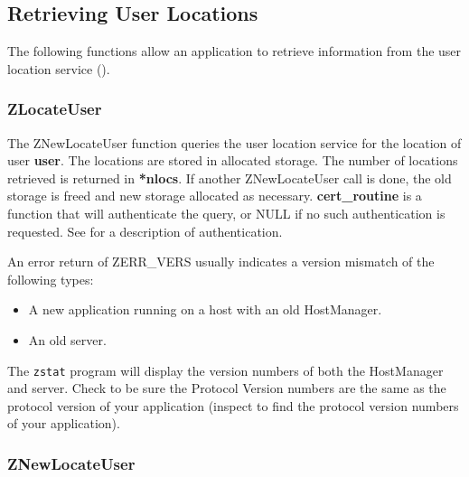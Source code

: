 %
\subsection{Retrieving User Locations}
\label{retrieving-locations}

The following functions allow an application to retrieve information
from the user location service ().

\subsubsection{ZLocateUser}
\label{ZNewLocateUser}

\etemplate
{}

The ZNewLocateUser function queries the user location service for the
location of user {\bf user}.  The locations are stored in allocated
storage.  The number of locations retrieved is returned in {\bf
*nlocs}.  If another ZNewLocateUser call is done, the old storage is
freed and new storage allocated as necessary.  {\bf cert_routine} is a
function that will authenticate the query, or NULL if no such
authentication is requested.  See  for a
description of authentication.

An error return of ZERR_VERS usually indicates a version mismatch of the
following types:
\begin{itemize}
\item A new application running on a host with an old HostManager.
\item An old server.
\end{itemize}
The {\tt zstat} program will display the version numbers of both the
HostManager and server.  Check to be sure the Protocol Version numbers
are the same as the protocol version of your application (inspect
 to find the protocol version
numbers of your application).

\subsubsection{ZNewLocateUser}
\label{ZNewLocateUser}

